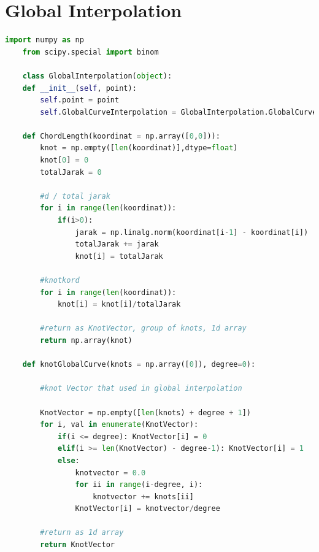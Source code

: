 \section{Global Interpolation}
\begin{lstlisting}[language=Python,basicstyle=\tiny]
    import numpy as np
    from scipy.special import binom

    class GlobalInterpolation(object):
    def __init__(self, point):
        self.point = point
        self.GlobalCurveInterpolation = GlobalInterpolation.GlobalCurveInterpolation(point)

    def ChordLength(koordinat = np.array([0,0])):
        knot = np.empty([len(koordinat)],dtype=float)
        knot[0] = 0
        totalJarak = 0

        #d / total jarak
        for i in range(len(koordinat)):
            if(i>0):
                jarak = np.linalg.norm(koordinat[i-1] - koordinat[i])
                totalJarak += jarak
                knot[i] = totalJarak
    
        #knotkord
        for i in range(len(koordinat)):
            knot[i] = knot[i]/totalJarak

        #return as KnotVector, group of knots, 1d array
        return np.array(knot)
    
    def knotGlobalCurve(knots = np.array([0]), degree=0):
    
        #knot Vector that used in global interpolation

        KnotVector = np.empty([len(knots) + degree + 1])
        for i, val in enumerate(KnotVector):
            if(i <= degree): KnotVector[i] = 0 
            elif(i >= len(KnotVector) - degree-1): KnotVector[i] = 1
            else:
                knotvector = 0.0
                for ii in range(i-degree, i):
                    knotvector += knots[ii]
                KnotVector[i] = knotvector/degree

        #return as 1d array
        return KnotVector
\end{lstlisting}

